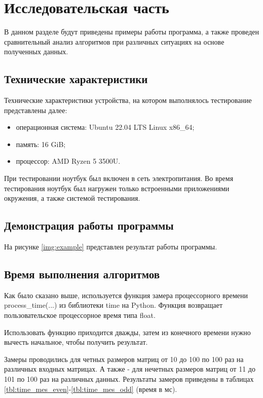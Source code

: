 \chapter{Исследовательская часть}

В данном разделе будут приведены примеры работы программа, а также проведен сравнительный анализ алгоритмов при различных ситуациях на основе полученных данных.

\section{Технические характеристики}

Технические характеристики устройства, на котором выполнялось тестирование представлены далее:

\begin{itemize}
    \item операционная система: Ubuntu 22.04 LTS \cite{ubuntu} Linux \cite{linux} x86\_64;
    \item память: 16 GiB;
    \item процессор: AMD Ryzen 5 3500U.
\end{itemize}

При тестировании ноутбук был включен в сеть электропитания. Во время тестирования ноутбук был нагружен только встроенными приложениями окружения, а также системой тестирования.
\pagebreak
\section{Демонстрация работы программы}

На рисунке \ref{img:example} представлен результат работы программы.

\clearpage

\section{Время выполнения алгоритмов}

Как было сказано выше, используется функция замера процессорного времени process\_time(...) из библиотеки time на Python. Функция возвращает пользовательское процессорное время типа float.

Использовать функцию приходится дважды, затем из конечного времени нужно вычесть начальное, чтобы получить результат.

Замеры проводились для четных размеров матриц от 10 до 100 по 100 раз на различных входных матрицах. А также - для нечетных размеров матриц от 11 до 101 по 100 раз на различных данных.
Результаты замеров приведены в таблицах \ref{tbl:time_mes_even}-\ref{tbl:time_mes_odd} (время в мс).

